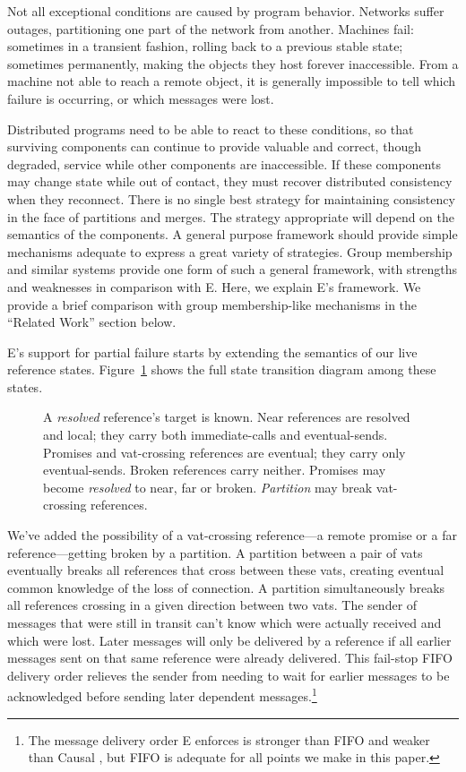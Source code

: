 \documentclass{llncs}
\begin{document}
Not all exceptional conditions are caused by program behavior.
Networks suffer outages, partitioning one part of the network from
another. Machines fail: sometimes in a transient fashion, rolling back
to a previous stable state; sometimes permanently, making the objects
they host forever inaccessible. From a machine not able to reach a
remote object, it is generally impossible to tell which failure is
occurring, or which messages were lost.

Distributed programs need to be able to react to these conditions, so
that surviving components can continue to provide valuable and
correct, though degraded, service while other components are
inaccessible. If these components may change state while out of
contact, they must recover distributed consistency when they
reconnect. There is no single best strategy for maintaining
consistency in the face of partitions and merges. The strategy
appropriate will depend on the semantics of the components. A general
purpose framework should provide simple mechanisms adequate to express
a great variety of strategies. Group membership and similar systems
provide one form of such a general framework, with strengths and
weaknesses in comparison with E. Here, we explain E's framework. We
provide a brief comparison with group membership-like mechanisms in
the ``Related Work'' section below.

E's support for partial failure starts by extending the semantics of
our live reference states. Figure~\ref{fig:refstates} shows the full
state transition diagram among these states.

\begin{figure}
\centerline{}
\caption{A \emph{resolved} reference's target is known. Near
  references are resolved and local; they carry both immediate-calls
  and eventual-sends. Promises and vat-crossing references are
  eventual; they carry only eventual-sends. Broken references carry
  neither. Promises may become \emph{resolved} to near, far or
  broken. \emph{Partition} may break vat-crossing references.}
\label{fig:refstates}
\end{figure}

We've added the possibility of a vat-crossing reference---a remote
promise or a far reference---getting broken by a partition. A
partition between a pair of vats eventually breaks all references that
cross between these vats, creating eventual common knowledge of the
loss of connection. A partition simultaneously breaks all references
crossing in a given direction between two vats. The sender of messages
that were still in transit can't know which were actually received and
which were lost. Later messages will only be delivered by a reference
if all earlier messages sent on that same reference were already
delivered. This fail-stop FIFO delivery order relieves the sender from
needing to wait for earlier messages to be acknowledged before sending
later dependent messages.\footnote{
%
The message delivery order E enforces is stronger than FIFO and weaker
than Causal \cite{tribble:channels}, but FIFO is adequate for all
points we make in this paper.}
\end{document}
